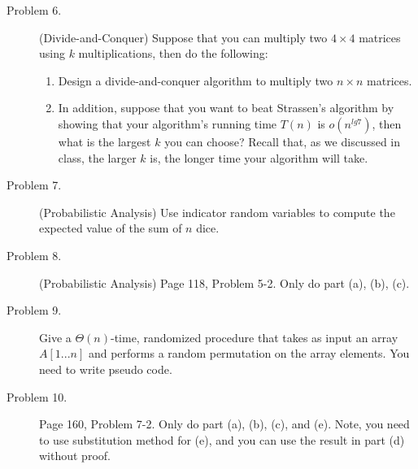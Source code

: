 \documentclass[11pt]{article}
\begin{document}
\begin{description}
\item[Problem 6.](Divide-and-Conquer) Suppose that you can multiply two $4\times 4$ matrices using $k$
multiplications, then do the following:
\begin{enumerate}
\item Design a divide-and-conquer algorithm to multiply two $n\times n$ matrices.
\item In addition, suppose that you want to beat Strassen's algorithm by showing that your
algorithm's running time $T(n)$ is $o(n^{lg 7})$, then what is the largest $k$ you can choose?
Recall that, as we discussed in class, the larger $k$ is, the longer time your algorithm will take.
\end{enumerate}

\item[Problem 7.] (Probabilistic Analysis) Use indicator random variables to compute the expected
value of the sum of $n$ dice.

\item[Problem 8.] (Probabilistic Analysis) Page 118, Problem 5-2. Only do part (a), (b), (c).

\item[Problem 9.] Give a $\Theta(n)$-time, randomized procedure
that takes as input an array $A[1...n]$ and performs a random permutation on the array elements.
You need to write pseudo code.

\item[Problem 10.] Page 160, Problem 7-2. Only do part (a), (b), (c), and (e). Note, you need to
use substitution method for (e), and you can use the result in part (d) without proof.





\end{description}
\end{document}
